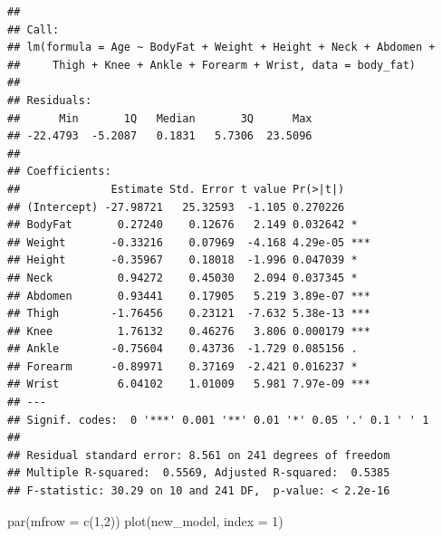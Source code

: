 \documentclass[
]{article}
\newenvironment{Shaded}{\begin{snugshade}}{\end{snugshade}}
\newcommand{\AttributeTok}[1]{\textcolor[rgb]{0.77,0.63,0.00}{#1}}
\newcommand{\DecValTok}[1]{\textcolor[rgb]{0.00,0.00,0.81}{#1}}
\newcommand{\FunctionTok}[1]{\textcolor[rgb]{0.00,0.00,0.00}{#1}}
\newcommand{\NormalTok}[1]{#1}
\begin{document}
\begin{verbatim}
## 
## Call:
## lm(formula = Age ~ BodyFat + Weight + Height + Neck + Abdomen + 
##     Thigh + Knee + Ankle + Forearm + Wrist, data = body_fat)
## 
## Residuals:
##      Min       1Q   Median       3Q      Max 
## -22.4793  -5.2087   0.1831   5.7306  23.5096 
## 
## Coefficients:
##              Estimate Std. Error t value Pr(>|t|)    
## (Intercept) -27.98721   25.32593  -1.105 0.270226    
## BodyFat       0.27240    0.12676   2.149 0.032642 *  
## Weight       -0.33216    0.07969  -4.168 4.29e-05 ***
## Height       -0.35967    0.18018  -1.996 0.047039 *  
## Neck          0.94272    0.45030   2.094 0.037345 *  
## Abdomen       0.93441    0.17905   5.219 3.89e-07 ***
## Thigh        -1.76456    0.23121  -7.632 5.38e-13 ***
## Knee          1.76132    0.46276   3.806 0.000179 ***
## Ankle        -0.75604    0.43736  -1.729 0.085156 .  
## Forearm      -0.89971    0.37169  -2.421 0.016237 *  
## Wrist         6.04102    1.01009   5.981 7.97e-09 ***
## ---
## Signif. codes:  0 '***' 0.001 '**' 0.01 '*' 0.05 '.' 0.1 ' ' 1
## 
## Residual standard error: 8.561 on 241 degrees of freedom
## Multiple R-squared:  0.5569, Adjusted R-squared:  0.5385 
## F-statistic: 30.29 on 10 and 241 DF,  p-value: < 2.2e-16
\end{verbatim}

\begin{Shaded}
\begin{Highlighting}[]
\FunctionTok{par}\NormalTok{(}\AttributeTok{mfrow =} \FunctionTok{c}\NormalTok{(}\DecValTok{1}\NormalTok{,}\DecValTok{2}\NormalTok{))}
\FunctionTok{plot}\NormalTok{(new\_model, }\AttributeTok{index =} \DecValTok{1}\NormalTok{)}
\end{Highlighting}
\end{Shaded}
\end{document}
